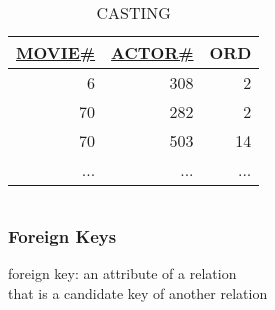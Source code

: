 \documentclass[dvipsnames]{beamer}
\theoremstyle{plain}
\begin{document}
\begin{frame}
\begin{example}
\begin{columns}[t]
      \begin{tiny}
      \begin{table}
        \caption{CASTING}
        \begin{tabular}{|r|r|r|}\hline
\underline{MOVIE\#} & \underline{ACTOR\#} & ORD\\[2pt]\hline\hline
                  6 &                 308 &   2\\\hline
                 70 &                 282 &   2\\\hline
                 70 &                 503 &  14\\\hline
                ... &                 ... & ...\\\hline
        \end{tabular}
      \end{table}
      \end{tiny}
    \end{columns}
  \end{example}
\end{frame}

\begin{frame}
  \frametitle{Foreign Keys}

  \begin{definition}
    \alert{foreign key}: an attribute of a relation\\
      that is a candidate key of another relation
  \end{definition}
\end{frame}
\end{document}
